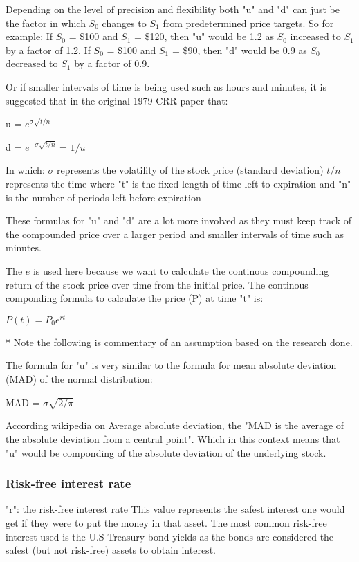 \documentclass[12pt, letterpaper]{article}
\begin{document}
Depending on the level of precision and flexibility both "u" and "d" can just be the factor in which ${S}_{0}$ changes to ${S}_{1}$ from predetermined price targets.
So for example:
If ${S}_{0}$ = \$100 and ${S}_{1}$ = \$120, then "u" would be 1.2 as ${S}_{0}$ increased to ${S}_{1}$ by a factor of 1.2.
If ${S}_{0}$ = \$100 and ${S}_{1}$ = \$90, then "d" would be 0.9 as ${S}_{0}$ decreased to ${S}_{1}$ by a factor of 0.9.

Or if smaller intervals of time is being used such as hours and minutes, it is suggested that in the original 1979 CRR paper that:

u = ${e}^{\sigma\sqrt{t/n}}$

d = ${e}^{-\sigma\sqrt{t/n}}$ = ${1/u}$

In which:
${\sigma}$ represents the volatility of the stock price (standard deviation) %
${t/n}$ represents the time where "t" is the fixed length of time left to expiration and "n" is the number of periods left before expiration

These formulas for "u" and "d" are a lot more involved as they must keep track of the compounded price over a larger period and smaller intervals of time such as minutes.

The ${e}$ is used here because we want to calculate the continous compounding return of the stock price over time from the initial price.
The continous componding formula to calculate the price (P) at time "t" is:

${P(t)} = {P}_{0}e^{rt}$

* Note the following is commentary of an assumption based on the research done.

The formula for "u" is very similar to the formula for mean absolute deviation (MAD) of the normal distribution:

MAD = ${\sigma\sqrt{2/\pi}}$

According wikipedia on Average absolute deviation, the "MAD is the average of the absolute deviation from a central point".
Which in this context means that "u" would be componding of the absolute deviation of the underlying stock.

\subsubsection*{Risk-free interest rate}

"r": the risk-free interest rate %
This value represents the safest interest one would get if they were to put the money in that asset.
The most common risk-free interest used is the U.S Treasury bond yields as the bonds are considered the safest (but not risk-free) assets to obtain interest.
\end{document}
